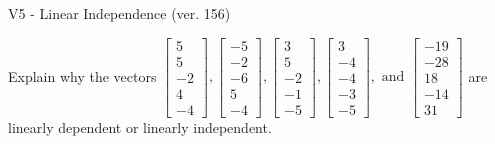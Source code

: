 \begin{exercise}
  \begin{exerciseTitle}V5 - Linear Independence (ver. 156)\end{exerciseTitle}
  \begin{exerciseStatement}
    Explain why the vectors \(\left[\begin{array}{r}
5 \\
5 \\
-2 \\
4 \\
-4
\end{array}\right] , \left[\begin{array}{r}
-5 \\
-2 \\
-6 \\
5 \\
-4
\end{array}\right] , \left[\begin{array}{r}
3 \\
5 \\
-2 \\
-1 \\
-5
\end{array}\right] , \left[\begin{array}{r}
3 \\
-4 \\
-4 \\
-3 \\
-5
\end{array}\right] , \text{ and } \left[\begin{array}{r}
-19 \\
-28 \\
18 \\
-14 \\
31
\end{array}\right]\) are linearly dependent or linearly independent.	



\end{exerciseStatement}
\end{exercise}
